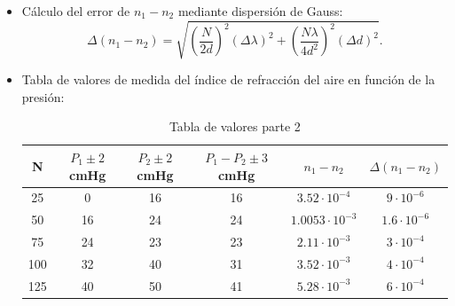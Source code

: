 \documentclass[11pt,letterpaper,twocolumn]{article}
\begin{document}
\begin{itemize}
\item Cálculo del error de $  n_1-n_2$ mediante dispersión de Gauss:
\[
    \Delta \left( n_1-n_2 \right) =\sqrt{\left( \frac{N}{2d} \right) ^2\left( \Delta  \lambda \right) ^2 + \left( \frac{N\lambda}{4d^2} \right) ^2\left( \Delta d \right) ^2} 
.\] 
\item Tabla de valores de medida del índice de refracción del aire en función de la presión:
\begin{table}[H]
    \caption{Tabla de valores parte 2 }
    \centering
    \begin{tabular}{|c|c|c|c|c|c|}
        \hline
        N & $ P_1 \pm 2  $ cmHg & $ P_2 \pm 2 $cmHg & $ P_1-P_2 \pm 3  $ cmHg  & $n_1-n_2$ & $\Delta \left( n_1-n_2 \right) $ \\ \hline
        25 & 0 & 16 & 16  & $3.52\cdot 10^{-4}$ & $9 \cdot 10^{-6}$ \\ 
        50 & 16 & 24 & 24  & $1.0053\cdot 10^{-3}$ & $1.6 \cdot 10^{-6}$\\
        75 & 24 & 23 & 23 & $2.11 \cdot 10^{-3}$ & $3 \cdot 10^{-4}$\\
        100 & 32 & 40 & 31  & $3.52\cdot 10^{-3}$ & $4 \cdot 10^{-4}$\\
        125 & 40 & 50 & 41  & $5.28\cdot 10^{-3}$ & $6 \cdot 10^{-4}$\\ \hline
    \end{tabular}
    \label{}
\end{table}

\end{itemize}
\end{document}
